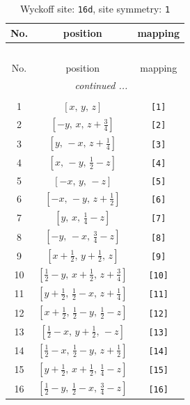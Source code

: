 \documentclass[fleqn,8pt]{jsarticle}
\begin{document}
\begin{longtable}{ccc}
\caption{Wyckoff site: {\tt 16d}, site symmetry: {\tt 1}}
 \\
 \hline \hline
No. & position & mapping \\ \hline \endfirsthead

\multicolumn{2}{l}{\tablename\ \thetable{}} \\
 \hline \hline
No. & position & mapping \\ \hline \endhead

 \hline \hline
\multicolumn{2}{r}{\footnotesize\it continued ...} \\ \endfoot

 \hline \hline
\multicolumn{2}{r}{} \\ \endlastfoot

1 & $\left[ x,\, y,\, z \right]$ & {\tt [1]} \\ \hline
2 & $\left[ - y,\, x,\, z + \frac{3}{4} \right]$ & {\tt [2]} \\ \hline
3 & $\left[ y,\, - x,\, z + \frac{1}{4} \right]$ & {\tt [3]} \\ \hline
4 & $\left[ x,\, - y,\, \frac{1}{2} - z \right]$ & {\tt [4]} \\ \hline
5 & $\left[ - x,\, y,\, - z \right]$ & {\tt [5]} \\ \hline
6 & $\left[ - x,\, - y,\, z + \frac{1}{2} \right]$ & {\tt [6]} \\ \hline
7 & $\left[ y,\, x,\, \frac{1}{4} - z \right]$ & {\tt [7]} \\ \hline
8 & $\left[ - y,\, - x,\, \frac{3}{4} - z \right]$ & {\tt [8]} \\ \hline
9 & $\left[ x + \frac{1}{2},\, y + \frac{1}{2},\, z \right]$ & {\tt [9]} \\ \hline
10 & $\left[ \frac{1}{2} - y,\, x + \frac{1}{2},\, z + \frac{3}{4} \right]$ & {\tt [10]} \\ \hline
11 & $\left[ y + \frac{1}{2},\, \frac{1}{2} - x,\, z + \frac{1}{4} \right]$ & {\tt [11]} \\ \hline
12 & $\left[ x + \frac{1}{2},\, \frac{1}{2} - y,\, \frac{1}{2} - z \right]$ & {\tt [12]} \\ \hline
13 & $\left[ \frac{1}{2} - x,\, y + \frac{1}{2},\, - z \right]$ & {\tt [13]} \\ \hline
14 & $\left[ \frac{1}{2} - x,\, \frac{1}{2} - y,\, z + \frac{1}{2} \right]$ & {\tt [14]} \\ \hline
15 & $\left[ y + \frac{1}{2},\, x + \frac{1}{2},\, \frac{1}{4} - z \right]$ & {\tt [15]} \\ \hline
16 & $\left[ \frac{1}{2} - y,\, \frac{1}{2} - x,\, \frac{3}{4} - z \right]$ & {\tt [16]} \\
\end{longtable}
\end{document}

